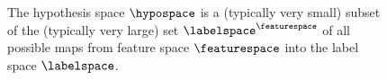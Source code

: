 \documentclass[12pt]{report}
\begin{document}

%
%

\begin{figure}[htbp]
\begin{center}
\end{center}
\caption{The hypothesis space $\hypospace$ is a (typically very small) subset of the (typically very large) 
	set $\labelspace^{\featurespace}$ of all possible maps from feature space $\featurespace$ into the label 
	space $\labelspace$.}
\label{fig_hypo_space}
\end{figure}
\end{document}
